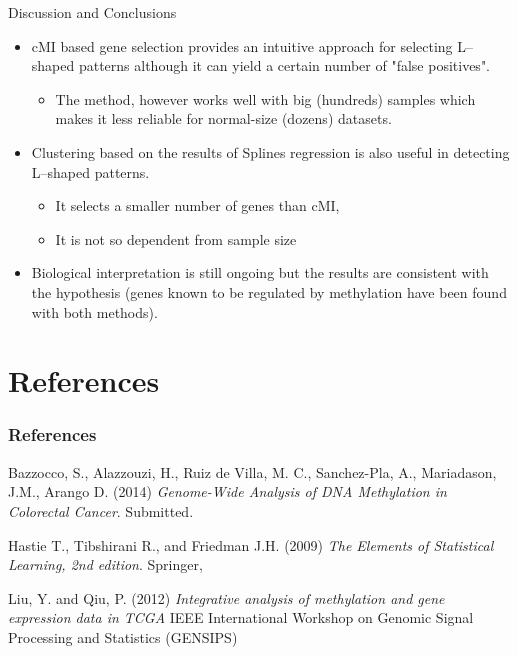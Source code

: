 \documentclass[handout]{beamer}
\begin{document}
\begin{frame}{Discussion and Conclusions}
  \begin{itemize}
  \item cMI based gene selection provides an intuitive approach for selecting L--shaped patterns although it can yield a certain number of "false positives".
  \begin{itemize}
         \item The method, however works well with big (hundreds) samples which makes it less reliable for normal-size (dozens) datasets.
  \end{itemize}
  \item Clustering based on the results of Splines regression is also useful in detecting L--shaped patterns.
       \begin{itemize}
         \item It selects a smaller number of genes than cMI,
         \item It is not so dependent from sample size
       \end{itemize}
  \item Biological interpretation is still ongoing but the results are consistent with the hypothesis
    (genes known to be regulated by methylation have been found with both methods).
\end{itemize}
\end{frame}

\section*{References}
\begin{frame}\frametitle{References}
\begin{thebibliography}{9}
%




 Bazzocco, S., Alazzouzi, H., Ruiz de Villa, M. C., Sanchez-Pla, A., Mariadason, J.M., Arango D. (2014) \emph{Genome-Wide Analysis of DNA Methylation in Colorectal Cancer}. Submitted.

 Hastie T., Tibshirani R., and Friedman J.H. (2009) \emph{The Elements of Statistical Learning, 2nd edition}. Springer, 

 Liu, Y. and Qiu, P. (2012) \emph{Integrative analysis of methylation and gene expression data in TCGA} IEEE International Workshop on Genomic Signal Processing and Statistics (GENSIPS)

\end{thebibliography}

\end{frame}
\end{document}
